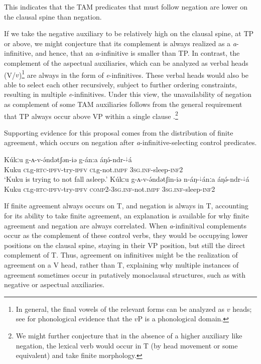 This indicates that the TAM predicates that must follow negation are lower on the clausal spine than negation.

If we take the negative auxiliary to be relatively high on the clausal spine, at TP or above, we might conjecture that its complement is always realized as a \textit{a}-infinitive, and hence, that an  \textit{a}-infinitive is smaller than TP. In contrast, the complement of the aspectual auxiliaries, which can be analyzed as verbal  heads (V/$v$)\footnote{In general, the final vowels of the relevant forms can be analyzed as $v$ heads; see \citet{jenks15} for phonological evidence that the $v$P is a phonological domain.} are always in the form of \textit{e}-infinitives. These verbal heads would also be able to select each other recursively, subject to further ordering constraints, resulting in multiple \textit{e}-infinitives. Under this view, the unavailability of negation as complement of some TAM auxiliaries follows from the general requirement that TP always occur above VP within a single clause \citep[cf.][]{cinque99}.\footnote{We might further conjecture that in the absence of a higher auxiliary like negation, the lexical verb would occur in T (by head movement or some equivalent) and take finite morphology.}

Supporting evidence for this proposal comes from the distribution of finite agreement, which occurs on negation after \textit{a}-infinitive-selecting control predicates.

\ea  
	\ea  \gll  Kúkːu g-ʌ-v-ə́ndətʃən-iə g-án:a áŋə́-ndr-$^{↓}$á		\\
Kuku \textsc{cl}g-\textsc{rtc}-\textsc{ipfv}-try-\textsc{ipfv} \textsc{cl}g-not.\textsc{impf} \textsc{3sg.inf}-sleep-\textsc{inf2}\\
\glt ‘Kuku is trying to not fall asleep.’
\ex  \gll  *Kúkːu g-ʌ-v-ə́ndətʃin-iə n-áŋ-$^{↓}$ánːa áŋə́-ndr-$^{↓}$á	 		\\
Kuku \textsc{cl}g-\textsc{rtc}-\textsc{ipfv}-try-\textsc{ipfv} \textsc{comp2}-\textsc{3sg.inf}-not.\textsc{impf} \textsc{3sg.inf}-sleep-\textsc{inf2}\\
\z 
\z 

If finite agreement always occurs on T, and negation is always in T, accounting for its ability to take finite agreement, an explanation is available for why finite agreement and negation are always correlated. When \textit{a}-infinitival complements occur as the complement of these control verbs, they would be occupying lower positions on the clausal spine, staying in their VP position, but still the direct complement of T. Thus, agreement on infinitives might be the realization of agreement on a V head, rather than T, explaining why multiple instances of agreement sometimes occur in putatively monoclausal structures, such as with negative or aspectual auxiliaries.

